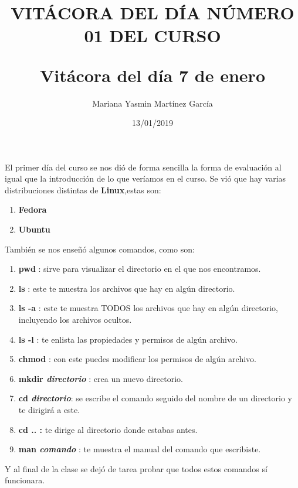 \documentclass[letterpaper, 12pt, twoside]{article}
\title{\Huge\item\color{red}\textbf {VITÁCORA DEL DÍA NÚMERO 01 DEL CURSO}}
\author{Mariana Yasmin Martínez García}
\date{13/01/2019}
\begin{document}
	\maketitle
	\begin{figure}
		\centering
		\caption{}
		\label{fig:1}
	\end{figure}
	
	
	\newpage
	
	\title{\huge\textbf{Vitácora del día 7 de enero\\}}
	El primer día del curso se nos dió de forma sencilla la forma de evaluación al igual que la introducción de lo que veríamos en el curso.
	Se vió que hay varias distribuciones distintas de \textbf{Linux},estas son:
	\begin{enumerate}
		\item\textbf{Fedora}
		\item\textbf{Ubuntu}

	\end{enumerate} 
	También se nos enseñó algunos comandos, como son: 
	\begin{enumerate}
		\item \textbf{\large pwd }: sirve para visualizar el directorio en el que nos encontramos.
		\item \textbf{\large ls }: este te muestra los archivos que hay en algún directorio.
		\item \textbf{\large ls -a }: este te muestra TODOS los archivos que hay en algún directorio, incluyendo los archivos ocultos.
		\item \textbf{\large ls -l }: te enlista las propiedades y permisos de algún archivo.
		\item \textbf{\large chmod }: con este puedes modificar los permisos de algún archivo.
		\item \textbf{\large mkdir \textit{directorio} }: crea un nuevo directorio.
		\item \textbf{\large cd \textit{directorio}}: se escribe el comando seguido del nombre de un directorio y te dirigirá a este.
		\item \textbf{\large cd .. :} te dirige al directorio donde estabas antes.
		\item \textbf{\large man \textit{comando} }: te muestra el manual del comando que escribiste.	
	\end{enumerate}
    Y al final de la clase se dejó de tarea probar que todos estos comandos sí funcionara.

	
	
	
\end{document}
